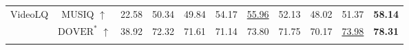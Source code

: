 \begin{table*}[t]
{\begin{tabular}{c|c|c|c|c|c|c|c|c|c|c}
    \multirow{2}{*}{VideoLQ} %
                             & MUSIQ $\uparrow$       & 22.58               & 50.34    & 49.84        & 54.17           & \underline{55.96}   & 52.13           & 48.02           & 51.37           & \textbf{58.14}  \\
                             & $\text{DOVER}^*$ $\uparrow$     & 38.92      & 72.32    & 71.61        & 71.14           & 73.80        & 71.75           & 70.17           & \underline{73.98}      & \textbf{78.31}  \\ \Xhline{2\arrayrulewidth}
    \end{tabular}
    }
    \vspace{-2mm}
\end{table*}